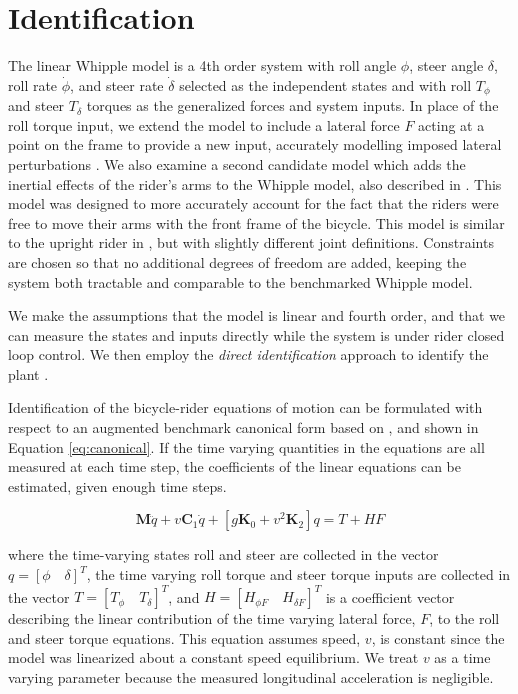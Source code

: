 \documentclass[a4paper]{article}
\begin{document}

\section*{Identification}
\label{sec:identification}

The linear Whipple model is a 4th order system with roll angle $\phi$, steer
angle $\delta$, roll rate $\dot{\phi}$, and steer rate $\dot{\delta}$ selected
as the independent states and with roll $T_\phi$ and steer $T_\delta$ torques
as the generalized forces and system inputs. In place of the roll torque input,
we extend the model to include a lateral force $F$ acting at a point on the
frame to provide a new input, accurately modelling imposed lateral
perturbations \cite{Moore2012}. We also examine a second candidate model which
adds the inertial effects of the rider's arms to the Whipple model, also
described in \cite{Moore2012}. This model was designed to more accurately
account for the fact that the riders were free to move their arms with the
front frame of the bicycle. This model is similar to the upright rider in
\cite{Schwab2010}, but with slightly different joint definitions. Constraints
are chosen so that no additional degrees of freedom are added, keeping the
system both tractable and comparable to the benchmarked Whipple model.

We make the assumptions that the model is linear and fourth order, and that we
can measure the states and inputs directly while the system is under rider
closed loop control. We then employ the \emph{direct identification} approach
to identify the plant \cite{Ljung1999}.

Identification of the bicycle-rider equations of motion can be formulated with
respect to an augmented benchmark canonical form based on \cite{Meijaard2007},
and shown in Equation \ref{eq:canonical}. If the time varying quantities in the
equations are all measured at each time step, the coefficients of the linear
equations can be estimated, given enough time steps.

\begin{equation}
  \mathbf{M} \ddot{q} + v \mathbf{C}_1 \dot{q} + [g \mathbf{K}_0 + v^2
  \mathbf{K}_2] q = T + H F
  \label{eq:canonical}
\end{equation}

where the time-varying states roll and steer are collected in the vector $q =
[\phi \quad \delta]^T$, the time varying  roll torque and steer torque inputs
are collected in the vector $T = [T_\phi \quad T_\delta]^T$, and $H = [H_{\phi
F} \quad H_{\delta F}]^T$ is a coefficient vector describing the linear
contribution of the time varying lateral force, $F$, to the roll and steer
torque equations. This equation assumes  speed, $v$, is constant since the
model was linearized about a constant speed equilibrium. We treat $v$ as a time
varying parameter because the measured longitudinal acceleration is negligible.
\end{document}
